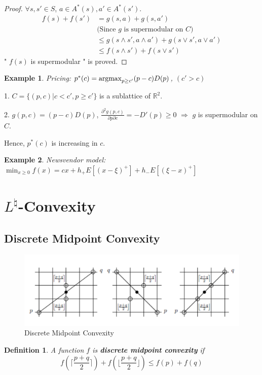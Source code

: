\documentclass[11pt,a4paper]{article}
\newcommand{\argmax}{\operatornamewithlimits{argmax}}
\newtheorem{definition}{Definition}
\newtheorem{example}{Example}
\begin{document}
\begin{proof}
$\forall s,s'\in S$, $a\in A^*(s),a'\in A^*(s')$.
\begin{equation}
    \begin{aligned}
        f(s)+f(s')&=g(s,a)+g(s,a')\\
        &\text{(Since $g$ is supermodular on $C$)}\\
        &\leq g(s\wedge s',a\wedge a')+g(s\vee s',a\vee a')\\
        &\leq f(s\wedge s')+f(s\vee s')
    \end{aligned}
    \nonumber
\end{equation}
" $f(s)$ is supermodular " is proved.
\end{proof}

\begin{example}
    Pricing: 
$p^*(c)=\argmax_{p\geq c'}(p-c)D(p)$, $(c'>c)$
\end{example}
1. $C=\{(p,c)|c<c',p\geq c'\}$ is a sublattice of $\mathbb{R}^2$.

2. $g(p,c)=(p-c)D(p)$, $\frac{\partial^2 g(p,c)}{\partial p\partial c}=-D'(p)\geq 0$ $\Rightarrow$ $g$ is supermodular on $C$.

Hence, $p^*(c)$ is increasing in $c$.

\begin{example}
Newsvendor model: $\min_{x\geq 0}f(x)=cx+h_+E[(x-\xi)^+]+h_-E[(\xi-x)^+]$
\end{example}



\section{$L^\natural$-Convexity}
\subsection{Discrete Midpoint Convexity}
\begin{center}\begin{figure}[htbp]
    \centering
    \includegraphics[scale=0.5]{DMC.png}
    \caption{Discrete Midpoint Convexity}
    \label{}
\end{figure}\end{center}
\begin{definition}
A function $f$ is \textbf{discrete midpoint convexity} if $$f(\lceil\frac{p+q}{2}\rceil)+f(\lfloor\frac{p+q}{2}\rfloor)\leq f(p)+f(q)$$
\end{definition}
\end{document}
